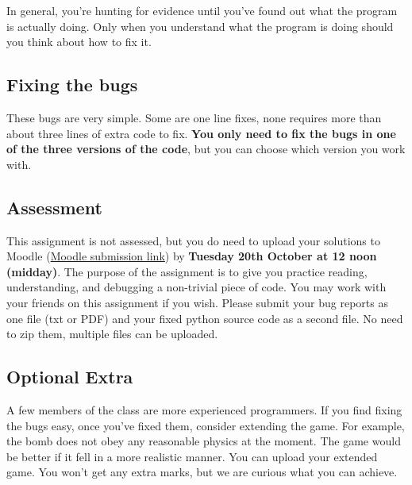 \documentclass{article}
\begin{document}
In general, you're hunting for evidence until you've found out what
the program is actually doing.  Only when you understand what the
program is doing should you think about how to fix it.

\subsection*{Fixing the bugs}

These bugs are very simple.  Some are one line fixes, none requires
more than about three lines of extra code to fix.  \textbf{You only
  need to fix the bugs in one of the three versions of the code}, but
you can choose which version you work with.

\subsection*{Assessment}

This assignment is not assessed, but you do need to upload your solutions to Moodle (\href{https://moodle.ucl.ac.uk/mod/assign/view.php?id=9108700}{Moodle submission link}) by \textbf{Tuesday 20th October at 12 noon (midday)}.  The purpose of the assignment is to
give you practice reading, understanding, and debugging a non-trivial
piece of code.  You may work with your friends on this assignment if
you wish.  Please submit your bug reports as one file (txt or PDF) and your fixed python source code as a second file.  No need to zip them, multiple files can be uploaded.

\subsection*{Optional Extra}

A few members of the class are more experienced programmers.  If you
find fixing the bugs easy, once you've fixed them, consider extending
the game.  For example, the bomb does not obey any reasonable physics
at the moment.  The game would be better if it fell in a more
realistic manner.  You can upload your extended game.  You won't get any extra marks, but we are
curious what you can achieve.
\end{document}
